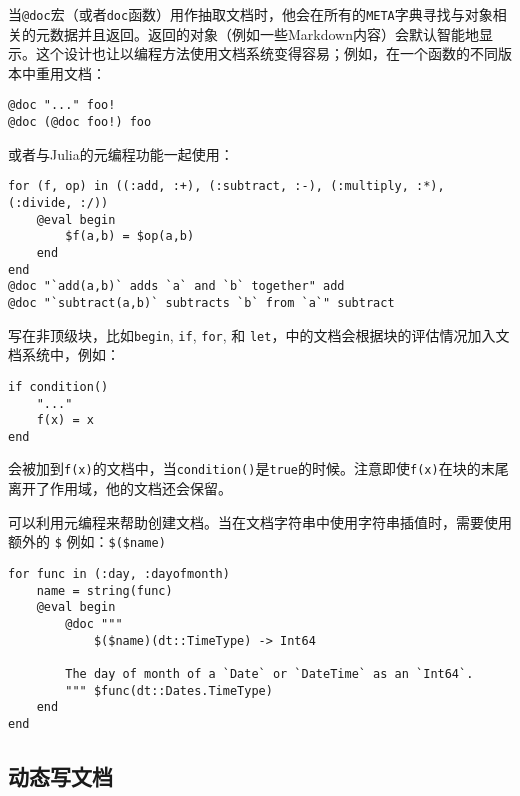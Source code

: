 当\texttt{@doc}宏（或者\texttt{doc}函数）用作抽取文档时，他会在所有的\texttt{META}字典寻找与对象相关的元数据并且返回。返回的对象（例如一些Markdown内容）会默认智能地显示。这个设计也让以编程方法使用文档系统变得容易；例如，在一个函数的不同版本中重用文档：




\begin{verbatim}
@doc "..." foo!
@doc (@doc foo!) foo
\end{verbatim}



或者与Julia的元编程功能一起使用：




\begin{verbatim}
for (f, op) in ((:add, :+), (:subtract, :-), (:multiply, :*), (:divide, :/))
    @eval begin
        $f(a,b) = $op(a,b)
    end
end
@doc "`add(a,b)` adds `a` and `b` together" add
@doc "`subtract(a,b)` subtracts `b` from `a`" subtract
\end{verbatim}



写在非顶级块，比如\texttt{begin}, \texttt{if}, \texttt{for}, 和 \texttt{let}，中的文档会根据块的评估情况加入文档系统中，例如：




\begin{verbatim}
if condition()
    "..."
    f(x) = x
end
\end{verbatim}



会被加到\texttt{f(x)}的文档中，当\texttt{condition()}是\texttt{true}的时候。注意即使\texttt{f(x)}在块的末尾离开了作用域，他的文档还会保留。



可以利用元编程来帮助创建文档。当在文档字符串中使用字符串插值时，需要使用额外的 \texttt{\$} 例如：\texttt{\$(\$name)}




\begin{verbatim}
for func in (:day, :dayofmonth)
    name = string(func)
    @eval begin
        @doc """
            $($name)(dt::TimeType) -> Int64

        The day of month of a `Date` or `DateTime` as an `Int64`.
        """ $func(dt::Dates.TimeType)
    end
end
\end{verbatim}



\hypertarget{7588661187190124361}{}


\subsection{动态写文档}




